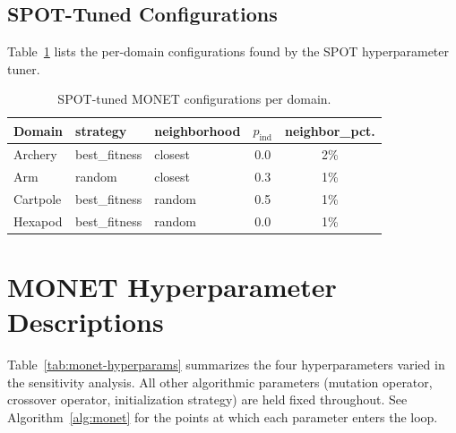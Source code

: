 \subsection{SPOT-Tuned Configurations}

Table~\ref{tab:spot-configs} lists the per-domain configurations found by the SPOT hyperparameter tuner.

\begin{table}[h]
\centering
\caption{SPOT-tuned MONET configurations per domain.}
\label{tab:spot-configs}
\small
\begin{tabular}{@{}lllcc@{}}
\toprule
\textbf{Domain} & \textbf{strategy} & \textbf{neighborhood} & $p_\text{ind}$ & \textbf{neighbor\_pct.} \\
\midrule
Archery  & best\_fitness & closest  & 0.0 & 2\% \\
Arm      & random        & closest  & 0.3 & 1\% \\
Cartpole & best\_fitness & random   & 0.5 & 1\% \\
Hexapod  & best\_fitness & random   & 0.0 & 1\% \\
\bottomrule
\end{tabular}
\end{table}

\section{MONET Hyperparameter Descriptions}\label{app:hyperparameters}

Table~\ref{tab:monet-hyperparams} summarizes the four hyperparameters varied in the sensitivity analysis. All other algorithmic parameters (mutation operator, crossover operator, initialization strategy) are held fixed throughout. See Algorithm~\ref{alg:monet} for the points at which each parameter enters the loop.

